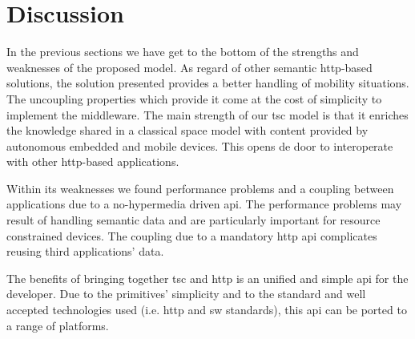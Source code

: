 \section{Discussion}

In the previous sections we have get to the bottom of the strengths and weaknesses of the proposed model.
As regard of other semantic \ac{http}-based solutions, the solution presented provides a better handling of mobility situations. %
The uncoupling properties which provide it come at the cost of simplicity to implement the middleware.
The main strength of our \ac{tsc} model is that it enriches the knowledge shared in a classical space model with content provided by autonomous embedded and mobile devices.
This opens de door to interoperate with other \ac{http}-based applications.


Within its weaknesses we found performance problems and a coupling between applications due to a no-hypermedia driven \ac{api}.
The performance problems may result of handling semantic data and are particularly important for resource constrained devices.
The coupling due to a mandatory \ac{http} \ac{api} complicates reusing third applications' data.


The benefits of bringing together \ac{tsc} and \ac{http} is an unified and simple \ac{api} for the developer. %
Due to the primitives' simplicity and to the standard and well accepted technologies used (i.e. \ac{http} and \ac{sw} standards), this \ac{api} can be ported to a range of platforms.